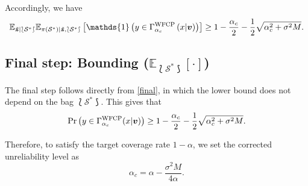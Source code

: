 \documentclass[12pt, draftclsnofoot, onecolumn]{IEEEtran}
\begin{document}
Accordingly, we have
\begin{equation}\label{final}
    \mathbb{E}_{\tilde{\boldsymbol{z}}| \lbag\mathcal{S}^*\rbag}\mathbb{E}_{\pi(\mathcal{S}^*)|\tilde{\boldsymbol{z}},\lbag\mathcal{S}^*\rbag}\left[\mathds{1}\left(y \in \Gamma_{\alpha_c}^{\text{\rm{WFCP}}}\left(x|\boldsymbol{v}\right)\right)\right]\geq1 - \frac{\alpha_c}{2}-\frac{1}{2}\sqrt{\alpha_c^2 + \sigma^2M}.
\end{equation}

\subsection*{\textbf{Final step: Bounding ($\mathbb{E}_{\lbag\mathcal{S}^* \rbag}[\cdot]$)}}
The final step follows directly from \eqref{final}, in which the lower bound does not depend on the bag $\lbag\mathcal{S}^*\rbag$. This gives that 
\begin{equation}
    \Pr\left(y \in \Gamma_{\alpha_c}^{\text{\rm{WFCP}}}(x|\boldsymbol{v})\right) \geq 1 - \frac{\alpha_c}{2}-\frac{1}{2}\sqrt{\alpha_c^2 + \sigma^2M}.
\end{equation}

Therefore, to satisfy the target coverage rate $1-\alpha$, we set the corrected unreliability level as
\begin{equation}\label{final2}
    \alpha_c = \alpha - \frac{\sigma^2 M}{4 \alpha}.
\end{equation}



\end{document}
